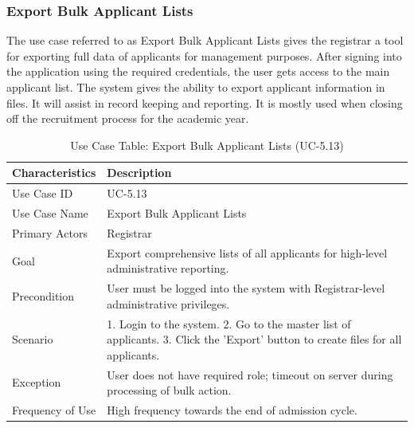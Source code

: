 \subsubsection{Export Bulk Applicant Lists}
The use case referred to as Export Bulk Applicant Lists gives the registrar a tool for exporting full data of applicants for management purposes. After signing into the application using the required credentials, the user gets access to the main applicant list. The system gives the ability to export applicant information in files. It will assist in record keeping and reporting. It is mostly used when closing off the recruitment process for the academic year.
\begin{table}[H]
    \centering
    \small
    \renewcommand{\arraystretch}{1.4}
    \caption{Use Case Table: Export Bulk Applicant Lists (UC-5.13)} %
    \label{tab:export-bulk-applicant-registrar}
    \begin{tabularx}{\textwidth}{|l|X|}
        \hline
        \rowcolor[gray]{0.9} {Characteristics} & {Description} \\ \hline
        Use Case ID & UC-5.13 \\ \hline
        Use Case Name & Export Bulk Applicant Lists \\ \hline
        Primary Actors & Registrar \\ \hline
        Goal & Export comprehensive lists of all applicants for high-level administrative reporting. \\ \hline
        Precondition & User must be logged into the system with Registrar-level administrative privileges. \\ \hline
        Scenario & 1. Login to the system. 2. Go to the master list of applicants. 3. Click the 'Export' button to create files for all applicants. \\ \hline
        Exception & User does not have required role; timeout on server during processing of bulk action. \\ \hline
        Frequency of Use & High frequency towards the end of admission cycle. \\ \hline
    \end{tabularx}
\end{table}
\FloatBarrier